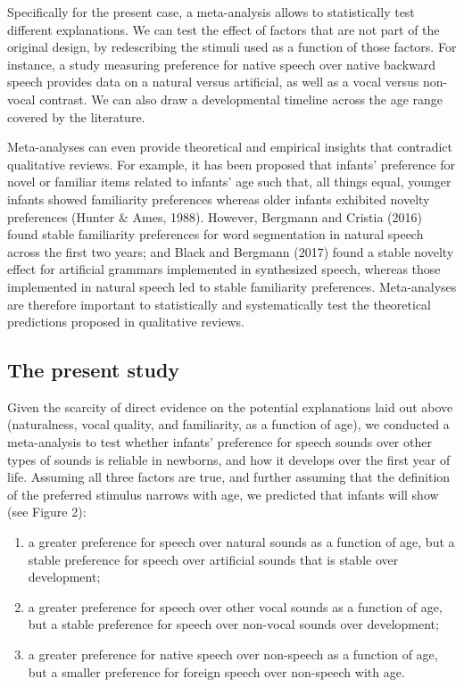 \documentclass[man]{apa6}
\providecommand{\tightlist}{%
  \setlength{\itemsep}{0pt}\setlength{\parskip}{0pt}}
\begin{document}
Specifically for the present case, a meta-analysis allows to
statistically test different explanations. We can test the effect of
factors that are not part of the original design, by redescribing the
stimuli used as a function of those factors. For instance, a study
measuring preference for native speech over native backward speech
provides data on a natural versus artificial, as well as a vocal versus
non-vocal contrast. We can also draw a developmental timeline across the
age range covered by the literature.

Meta-analyses can even provide theoretical and empirical insights that
contradict qualitative reviews. For example, it has been proposed that
infants' preference for novel or familiar items related to infants' age
such that, all things equal, younger infants showed familiarity
preferences whereas older infants exhibited novelty preferences (Hunter
\& Ames, 1988). However, Bergmann and Cristia (2016) found stable
familiarity preferences for word segmentation in natural speech across
the first two years; and Black and Bergmann (2017) found a stable
novelty effect for artificial grammars implemented in synthesized
speech, whereas those implemented in natural speech led to stable
familiarity preferences. Meta-analyses are therefore important to
statistically and systematically test the theoretical predictions
proposed in qualitative reviews.

\subsection{The present study}\label{the-present-study}

Given the scarcity of direct evidence on the potential explanations laid
out above (naturalness, vocal quality, and familiarity, as a function of
age), we conducted a meta-analysis to test whether infants' preference
for speech sounds over other types of sounds is reliable in newborns,
and how it develops over the first year of life. Assuming all three
factors are true, and further assuming that the definition of the
preferred stimulus narrows with age, we predicted that infants will show
(see Figure 2):

\begin{enumerate}
\def\labelenumi{\arabic{enumi}.}
\tightlist
\item
  a greater preference for speech over natural sounds as a function of
  age, but a stable preference for speech over artificial sounds that is
  stable over development;
\item
  a greater preference for speech over other vocal sounds as a function
  of age, but a stable preference for speech over non-vocal sounds over
  development;
\item
  a greater preference for native speech over non-speech as a function
  of age, but a smaller preference for foreign speech over non-speech
  with age.
\end{enumerate}
\end{document}
